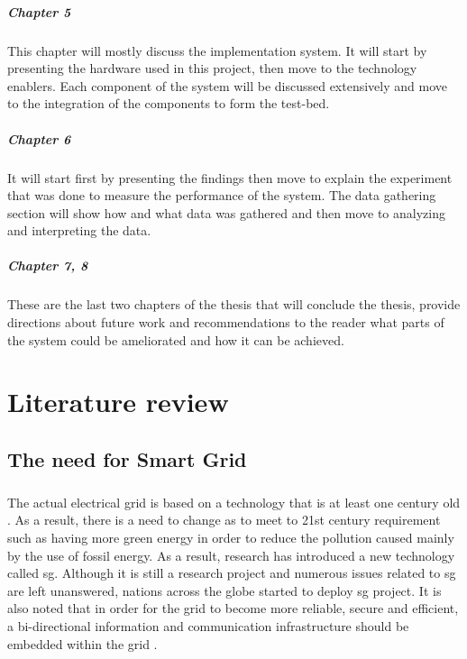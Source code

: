 \documentclass[oneside,12pt,a4paper,final]{book}
\begin{document}
\paragraph{Chapter 5}
This chapter will mostly discuss the implementation system. It will start by presenting the hardware used in this project, then move to the technology enablers. Each component of the system will be discussed extensively and move to the integration of the components to form the test-bed.
\paragraph{Chapter 6}
It will start first by presenting the findings then move to explain the experiment that was done to measure the performance of the system. The data gathering section will show how and what data was gathered and then move to analyzing and interpreting the data.
\paragraph{Chapter 7, 8}
These are the last two chapters of the thesis that will conclude the thesis, provide directions about future work and recommendations to the reader what parts of the system could be ameliorated and how it can be achieved.
\chapter{Literature review}
\section{The need for Smart Grid}
\paragraph{}
The actual electrical grid is based on a technology that is at least one century old \cite{ref5}. As a result, there is a need to change as to meet to 21st century requirement such as having more green energy in order to reduce the pollution caused mainly by the use of fossil energy. As a result, research has introduced a new technology called \gls{sg}. Although it is still a research project and numerous issues related to \gls{sg} are left unanswered, nations across the globe started to deploy \gls{sg} project. It is also noted that in order for the grid to become more reliable, secure and efficient, a bi-directional information and communication infrastructure should be embedded within the grid \cite{ref5}.
\end{document}
